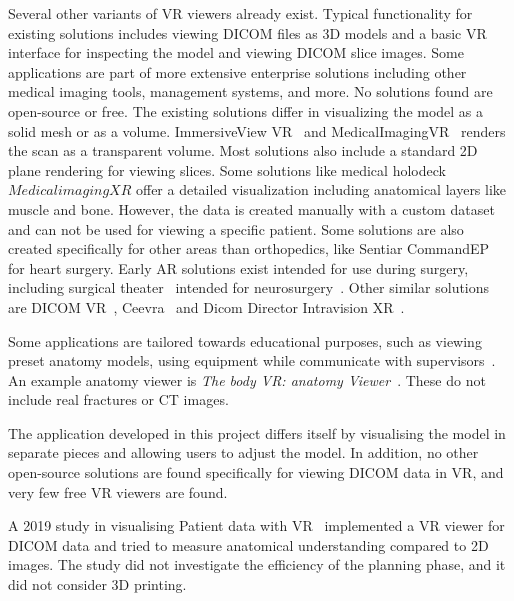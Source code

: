 \documentclass[a4paper]{report}
\begin{document}
Several other variants of VR viewers already exist. Typical functionality for existing solutions includes viewing DICOM files as 3D models and a basic VR interface for inspecting the model and viewing DICOM slice images. Some applications are part of more extensive enterprise solutions including other medical imaging tools, management systems, and more. No solutions found are open-source or free.
The existing solutions differ in visualizing the model as a solid mesh or as a volume. ImmersiveView VR~\cite{noauthor_immersiveview_nodate} and MedicalImagingVR~\cite{noauthor_medicalimagingvr_nodate} renders the scan as a transparent volume. Most solutions also include a standard 2D plane rendering for viewing slices.
Some solutions like medical holodeck~\cite{medical_holodeck_medicalholodeck_nodate} $Medical imaging XR$ offer a detailed visualization including anatomical layers like muscle and bone. However, the data is created manually with a custom dataset and can not be used for viewing a specific patient.
Some solutions are also created specifically for other areas than orthopedics, like Sentiar CommandEP~\cite{noauthor_commandep_nodate} for heart surgery.
Early AR solutions exist intended for use during surgery, including surgical theater~\cite{noauthor_virtual_nodate} intended for neurosurgery~\cite{anthony_patient-specific_2021}.
Other similar solutions are DICOM VR~\cite{noauthor_dicom_nodate-1}, Ceevra~\cite{ceevra_inc_using_2019} and Dicom Director Intravision XR~\cite{dicomdirectorcom_surgeons_nodate}.

Some applications are tailored towards educational purposes, such as viewing preset anatomy models, using equipment while communicate with supervisors~\cite{uppot_implementing_2019}. An example anatomy viewer is \emph{The body VR: anatomy Viewer}~\cite{noauthor_body_nodate}. These do not include real fractures or CT images.

The application developed in this project differs itself by visualising the model in separate pieces and allowing users to adjust the model.
In addition, no other open-source solutions are found specifically for viewing DICOM data in VR, and very few free VR viewers are found.

A 2019 study in visualising Patient data with VR~\cite{vertemati_virtual_2019} implemented a VR viewer for DICOM data and tried to measure anatomical understanding compared to 2D images. The study did not investigate the efficiency of the planning phase, and it did not consider 3D printing.
\end{document}
